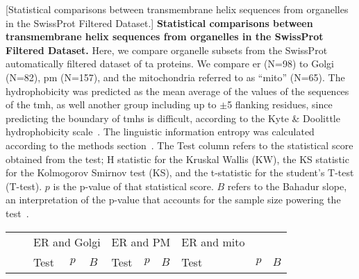     \begin{table}[htbp]
    \centering
    [Statistical comparisons between transmembrane helix sequences from organelles in the SwissProt Filtered Dataset.]
    {\textbf{Statistical comparisons between transmembrane helix sequences from organelles in the SwissProt Filtered Dataset.}
    Here, we compare organelle subsets from the SwissProt automatically filtered dataset of \gls{ta} proteins.
    We compare \gls{er} (N=98) to Golgi (N=82), \gls{pm} (N=157), and the mitochondria referred to as ``mito'' (N=65).
    The hydrophobicity was predicted as the mean average of the values of the sequences of the \gls{tmh}, as well another group including up to $\pm$5 flanking residues, since predicting the boundary of \gls{tmh}s is difficult, according to the Kyte \& Doolittle hydrophobicity scale~\cite{Kyte1982}.
    The linguistic information entropy was calculated according to the methods section~\cite{Shannon1948}.
    The Test column refers to the statistical score obtained from the test; H statistic for the Kruskal Wallis (KW), the KS statistic for the Kolmogorov Smirnov test (KS), and the t\--statistic for the student's T\--test (T-test).
    $p$ is the p\--value of that statistical score.
    $B$ refers to the Bahadur slope, an interpretation of the p\--value that accounts for the sample size powering the test~\cite{Bahadur1967, Bahadur1971}.}
        \tiny

         \begin{tabular}{ccccccccccc}
                                &       & \multicolumn{3}{c}{ER and Golgi} & \multicolumn{3}{c}{ER and PM} & \multicolumn{1}{l}{ER and mito} &       &  \\
                                &       & \multicolumn{1}{l}{Test} & \multicolumn{1}{l}{$p$} & \multicolumn{1}{l}{$B$} & \multicolumn{1}{l}{Test} & \multicolumn{1}{l}{$p$} & \multicolumn{1}{l}{$B$} & \multicolumn{1}{l}{Test} & \multicolumn{1}{l}{$p$} & \multicolumn{1}{l}{$B$} \\


\end{tabular}
\end{table}
